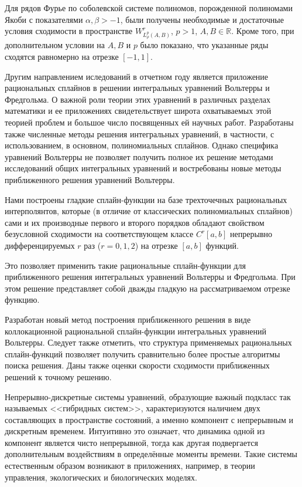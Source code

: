 Для рядов Фурье по соболевской системе полиномов, порожденной полиномами Якоби с показателями $\alpha, \beta  > -1$, были получены необходимые и достаточные условия сходимости в пространстве $W^r_{L^p_\rho(A,B)}$, $p > 1$, $A, B \in \mathbb{R}$. Кроме того, при дополнительном условии на $A, B$ и $p$ было показано, что  указанные ряды сходятся равномерно на отрезке $[-1,1]$.


Другим направлением иследований в отчетном году является приложение рациональных сплайнов в решении интегральных уравнений Вольтерры и Фредгольма. О важной роли теории этих уравнений в различных разделах математики и ее приложениях свидетельствует широта охватываемых этой теорией проблем и большое число посвященных ей научных работ. Разработаны также численные методы решения интегральных уравнений, в частности, с использованием, в основном, полиномиальных сплайнов. Однако специфика уравнений Вольтерры не позволяет получить полное их решение методами исследований общих интегральных уравнений и востребованы новые методы приближенного решения уравнений Вольтерры.

Нами построены гладкие сплайн-функции на базе трехточечных рациональных
интерполянтов, которые (в отличие от классических полиномиальных сплайнов)
сами и их производные первого и второго
порядков обладают свойством безусловной сходимости
на соответствующем классе $C^r[a,b]$ непрерывно дифференцируемых $r$ раз
($r=0,1,2$) на отрезке $[a,b]$ функций.

Это позволяет применить такие рациональные сплайн-функции для приближенного
решения интегральных уравнений Вольтерры и Фредгольма.
При этом решение представляет собой дважды гладкую на рассматриваемом отрезке
функцию.

Разработан новый метод построения
приближенного решения в виде коллокационной рациональной сплайн-функции
интегральных уравнений Вольтерры.
Следует также отметить, что структура применяемых рациональных сплайн-функций
позволяет получить сравнительно более простые алгоритмы поиска решения.
Даны также оценки скорости сходимости приближенных решений к точному решению.

Непрерывно-дискретные системы уравнений, образующие важный подкласс так называемых <<гибридных систем>>, характеризуются наличием двух составляющих в пространстве состояний, а именно компонент с непрерывным и дискретным временем. Интуитивно
это означает, что динамика одной из компонент является чисто
непрерывной, тогда как другая подвергается дополнительным
воздействиям в определённые моменты времени. Такие системы
естественным образом возникают в приложениях, например, в теории
управления, экологических   и биологических моделях.

